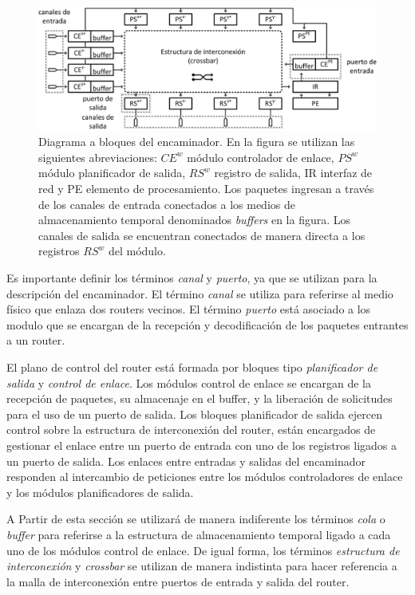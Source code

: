 \begin{figure}
	\includegraphics[width=\linewidth]{figures/ch4_top_level_router.png}
	\caption
		{	
			Diagrama a bloques del encaminador. En la figura se utilizan las siguientes abreviaciones: $CE^{w}$ módulo controlador de enlace, $PS^{w}$ módulo planificador de salida, $RS^{w}$ registro de salida, IR interfaz de red y PE elemento de procesamiento. Los paquetes ingresan a través de los canales de entrada conectados a los medios de almacenamiento temporal denominados \textit{buffers} en la figura. Los canales de salida se encuentran conectados de manera directa a los registros $RS^{w}$ del módulo.
		}
	\label{fig:ch4_top_level_router}
\end{figure}

Es importante definir los términos \textit{canal} y \textit{puerto}, ya que se utilizan para la descripción del encaminador. El término \textit{canal} se utiliza para referirse al medio físico que enlaza dos routers vecinos. El término \textit{puerto} está asociado a los modulo que se encargan de la recepción y decodificación de los paquetes entrantes a un router.

El plano de control del router está formada por bloques tipo \textit{planificador de salida} y \textit{control de enlace}. Los módulos control de enlace se encargan de la recepción de paquetes, su almacenaje en el buffer, y la liberación de solicitudes para el uso de un puerto de salida. Los bloques planificador de salida ejercen control sobre la estructura de interconexión del router, están encargados de gestionar el enlace entre un puerto de entrada con uno de los registros ligados a un puerto de salida. Los enlaces entre entradas y salidas del encaminador responden al intercambio de peticiones entre los módulos controladores de enlace y los módulos planificadores de salida.

A Partir de esta sección se utilizará de manera indiferente los términos \textit{cola} o \textit{buffer} para referirse a la estructura de almacenamiento temporal ligado a cada uno de los módulos control de enlace. De igual forma, los términos \textit{estructura de interconexión} y \textit{crossbar} se utilizan de manera indistinta para hacer referencia a la malla de interconexión entre puertos de entrada y salida del router.

